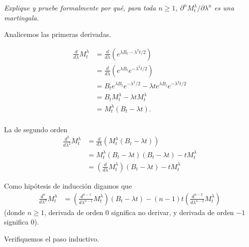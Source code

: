 \emph{
    Explique y pruebe formalmente por qu\'e, para toda 
    $n\geq 1$, $\partial^n M^\lambda_t/\partial \lambda^n$ es una martingala.\pn
}

\afterstatement\pn

Analicemos las primeras derivadas.

\begin{align}
    \frac{d}{d\lambda}  M_t^\lambda &=  \frac{d}{d\lambda} \left( e^{\lambda B_t - \lambda^2 t/2} \right)                       \\
                                    &=  \frac{d}{d\lambda} \left( e^{\lambda B_t} e^{- \lambda^2 t/2} \right)                   \\
                                    &=  B_t e^{\lambda B_t} e^{- \lambda^2/2}  - \lambda t e^{\lambda B_t} e^{- \lambda^2 t/2}  \\
                                    &=  B_t M_t^\lambda - \lambda t M_t^\lambda                                                 \\
                                    &=  M_t^\lambda (B_t - \lambda t).                                                          \\
\end{align}

La de segundo orden
\begin{align}
    \frac{d^2}{d\lambda^2}  M_t^\lambda     &=  \frac{d}{d\lambda} \left( M_t^\lambda (B_t - \lambda t) \right)                     \\
                                            &=  M_t^\lambda (B_t - \lambda t) (B_t - \lambda t) -  t M_t^\lambda                    \\ 
                                            &=  \left( \frac{d}{d\lambda} M_t^\lambda \right) (B_t - \lambda t) -  t M_t^\lambda         
\end{align}\pn

Como hipótesis de inducción digamos que
\begin{align}
    \frac{d^n}{d\lambda^n}  M_t^\lambda     &=  \left( \frac{d^{n-1}}{d\lambda^{n-1}} M_t^\lambda \right) (B_t - \lambda t) - 
                                            (n-1)t \left( \frac{d^{n-2}}{d\lambda^{n-2}} M_t^\lambda \right)
\end{align}
(donde $n \geq 1$, derivada de orden $0$ significa no derivar, y derivada de orden $-1$ significa $0$).\pn

Verifiquemos el paso inductivo.

